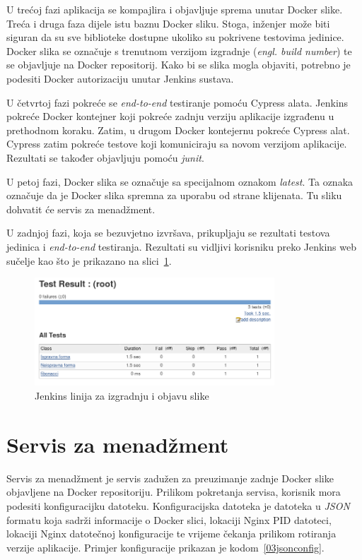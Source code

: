 U trećoj fazi aplikacija se kompajlira i objavljuje sprema unutar Docker slike. Treća i druga faza
dijele istu baznu Docker sliku. Stoga, inženjer može biti siguran da su sve biblioteke dostupne
ukoliko su pokrivene testovima jedinice. Docker slika se označuje s trenutnom verzijom izgradnje
(\textit{engl. build number}) te se objavljuje na Docker repositorij. Kako bi se slika mogla
objaviti, potrebno je podesiti Docker autorizaciju unutar Jenkins sustava.

U četvrtoj fazi pokreće se \textit{end-to-end} testiranje pomoću Cypress alata. Jenkins pokreće
Docker kontejner koji pokreće zadnju verziju aplikacije izgrađenu u prethodnom koraku. Zatim, u
drugom Docker kontejernu pokreće Cypress alat. Cypress zatim pokreće testove koji komuniciraju sa
novom verzijom aplikacije. Rezultati se također objavljuju pomoću \textit{junit}.

U petoj fazi, Docker slika se označuje sa specijalnom oznakom \textit{latest}. Ta oznaka označuje
da je Docker slika spremna za uporabu od strane klijenata. Tu sliku dohvatit će servis za
menadžment.

U zadnjoj fazi, koja se bezuvjetno izvršava, prikupljaju se rezultati testova jedinica i
\textit{end-to-end} testiranja. Rezultati su vidljivi korisniku preko Jenkins web sučelje kao što je
prikazano na slici~\ref{fig:03jenkins_result}.

\begin{figure}[h]
    \centering
    \includegraphics[width=0.8\textwidth]{img/03/jenkins_result.png}
    \caption{Jenkins linija za izgradnju i objavu slike}%
    \label{fig:03jenkins_result}
\end{figure}

\section{Servis za menadžment}
Servis za menadžment je servis zadužen za preuzimanje zadnje Docker slike objavljene na
Docker repositoriju. Prilikom pokretanja servisa, korisnik mora podesiti konfiguracijku datoteku.
Konfiguracijska datoteka je datoteka u \textit{JSON} formatu koja sadrži informacije o Docker slici,
lokaciji Nginx PID datoteci, lokaciji Nginx datotečnoj konfiguracije te vrijeme čekanja prilikom
rotiranja verzije aplikacije. Primjer konfiguracije prikazan je kodom~\ref{03jsonconfig}.

